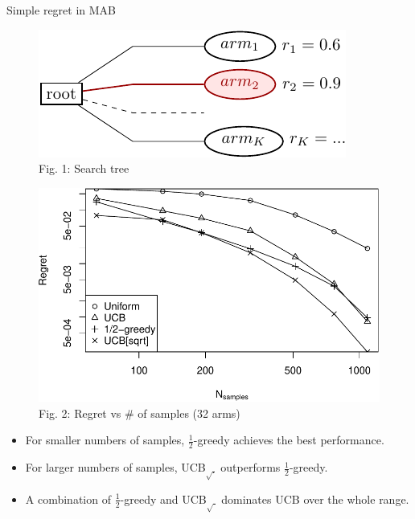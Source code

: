 \documentclass{beamer}
\begin{document}
\begin{frame}{Simple regret in MAB}

\begin{figure}[h]
  \begin{minipage}[c]{0.4\linewidth}
    \centering
    \includegraphics[scale=0.65]{onelevel-tree.pdf}\\
    {\scriptsize Fig. 1: Search tree}
  \end{minipage}
  \begin{minipage}[c]{0.4\linewidth}
    \centering
    \includegraphics[scale=0.4]{flat-trilevel-k=64-uqb=8.pdf}\\
    {\scriptsize Fig. 2: Regret vs \# of samples (32 arms)}
  \end{minipage}
  \label{fig:mab-simple-regret}
\end{figure}
\begin{itemize}
\item For smaller numbers of
samples, $\frac 1 2$-greedy achieves the best
performance.
\item For larger numbers of samples, UCB$_{\sqrt{\cdot}}$
outperforms $\frac 1 2$-greedy. 
\item A combination of $\frac 1
2$-greedy  and UCB$_{\sqrt{\cdot}}$ dominates UCB over the
whole range.
\end{itemize}
\end{frame}
\end{document}
